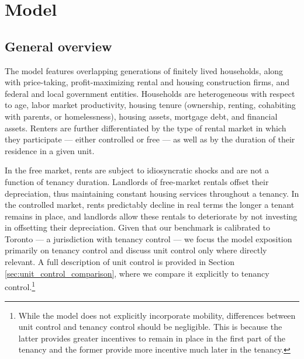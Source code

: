 \documentclass[parskip=full]{article}
\begin{document}
\section{Model}\label{sec:model}

\subsection{General overview}\label{sec:brief_overview}

The model features overlapping generations of finitely lived households, along with price-taking, profit-maximizing rental and housing construction firms, and federal and local government entities. Households are heterogeneous with respect to age, labor market productivity, housing tenure (ownership, renting, cohabiting with parents, or homelessness), housing assets, mortgage debt, and financial assets. Renters are further differentiated by the type of rental market in which they participate — either controlled or free — as well as by the duration of their residence in a given unit. 

In the free market, rents are subject to idiosyncratic shocks and are not a function of tenancy duration. Landlords of free-market rentals offset their depreciation, thus maintaining constant housing services throughout a tenancy. In the controlled market, rents predictably decline in real terms the longer a tenant remains in place, and landlords allow these rentals to deteriorate by not investing in offsetting their depreciation. Given that our benchmark is calibrated to Toronto — a jurisdiction with tenancy control — we focus the model exposition primarily on tenancy control and discuss unit control only where directly relevant. A full description of unit control is provided in Section \ref{sec:unit_control_comparison}, where we compare it explicitly to tenancy control.\footnote{While the model does not explicitly incorporate mobility, differences between unit control and tenancy control should be negligible. This is because the latter provides greater incentives to remain in place in the first part of the tenancy and the former provide more incentive much later in the tenancy.} %
\end{document}
